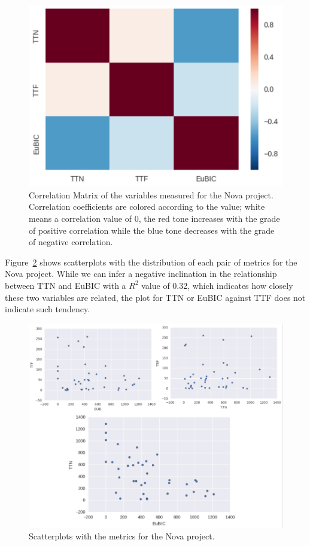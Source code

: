 \documentclass[10pt, conference]{IEEEtran}
\begin{document}
\begin{figure}[ht]
\centering
\includegraphics[width=\columnwidth]{correlationMatrix.png}
\caption{Correlation Matrix of the variables measured for the Nova project. Correlation coefficients are colored according to the value; white means a correlation value of 0, the red tone increases with the grade of positive correlation while the blue tone decreases with the grade of negative correlation.}
\label{fig:correlation}       %
\end{figure}

Figure~\ref{fig:graph} shows scatterplots with the distribution of each pair of metrics for the Nova project. While we can infer a negative inclination in the relationship between TTN and EuBIC with a $R^2$ value of 0.32, which indicates how closely these two variables are related, the plot for TTN or EuBIC against TTF does not indicate such tendency. 

\begin{figure}[ht]
\centering
\includegraphics[width=\columnwidth]{DistributionNova_b.png}
\caption{ Scatterplots with the metrics for the Nova project.}
\label{fig:graph}       %
\end{figure}
\end{document}
